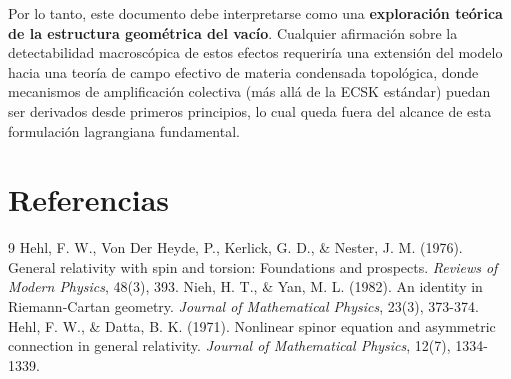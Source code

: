 \documentclass[12pt, a4paper]{article}
\begin{document}
Por lo tanto, este documento debe interpretarse como una \textbf{exploración teórica de la estructura geométrica del vacío}. Cualquier afirmación sobre la detectabilidad macroscópica de estos efectos requeriría una extensión del modelo hacia una teoría de campo efectivo de materia condensada topológica, donde mecanismos de amplificación colectiva (más allá de la ECSK estándar) puedan ser derivados desde primeros principios, lo cual queda fuera del alcance de esta formulación lagrangiana fundamental.

\section{Referencias}
\begin{thebibliography}{9}
 Hehl, F. W., Von Der Heyde, P., Kerlick, G. D., \& Nester, J. M. (1976). General relativity with spin and torsion: Foundations and prospects. \textit{Reviews of Modern Physics}, 48(3), 393.
 Nieh, H. T., \& Yan, M. L. (1982). An identity in Riemann-Cartan geometry. \textit{Journal of Mathematical Physics}, 23(3), 373-374.
 Hehl, F. W., \& Datta, B. K. (1971). Nonlinear spinor equation and asymmetric connection in general relativity. \textit{Journal of Mathematical Physics}, 12(7), 1334-1339.
\end{thebibliography}
\end{document}
